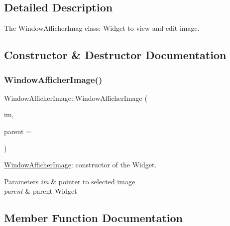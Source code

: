 \subsection{Detailed Description}
The Window\+Afficher\+Imag class\+: Widget to view and edit image. 

\subsection{Constructor \& Destructor Documentation}
\mbox{\label{class_window_afficher_image_a98a5ee55c190ac82b232248fb1ebde16}} 
\subsubsection{\texorpdfstring{Window\+Afficher\+Image()}{WindowAfficherImage()}}
{\footnotesize\ttfamily Window\+Afficher\+Image\+::\+Window\+Afficher\+Image (\begin{DoxyParamCaption}\item[{\hyperlink{classimage}{image} $\ast$}]{im,  }\item[{Q\+Widget $\ast$}]{parent = {} }\end{DoxyParamCaption})}



\hyperlink{class_window_afficher_image}{Window\+Afficher\+Image}\+: constructor of the Widget. 


\begin{DoxyParams}{Parameters}
{\em im} & pointer to selected image \\
\hline
{\em parent} & parent Widget \\
\hline
\end{DoxyParams}


\subsection{Member Function Documentation}
\mbox{\label{class_window_afficher_image_ab4d02c68e2c3ae753e7547b114e5bbb3}} 
